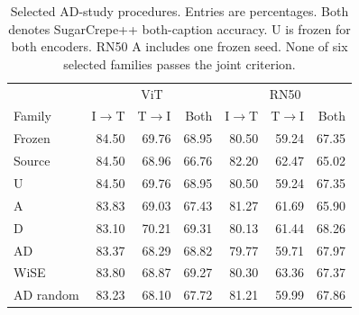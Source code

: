 \begin{table}[t]
\centering
\footnotesize
\setlength{\tabcolsep}{3pt}
\begin{tabular}{lrrrrrr}
\toprule
& \multicolumn{3}{c}{ViT} & \multicolumn{3}{c}{RN50}\\Family & I$\to$T & T$\to$I & Both & I$\to$T & T$\to$I & Both\\
\midrule
Frozen & 84.50 & 69.76 & 68.95 & 80.50 & 59.24 & 67.35\\
Source & 84.50 & 68.96 & 66.76 & 82.20 & 62.47 & 65.02\\
U & 84.50 & 69.76 & 68.95 & 80.50 & 59.24 & 67.35\\
A & 83.83 & 69.03 & 67.43 & 81.27 & 61.69 & 65.90\\
D & 83.10 & 70.21 & 69.31 & 80.13 & 61.44 & 68.26\\
AD & 83.37 & 68.29 & 68.82 & 79.77 & 59.71 & 67.97\\
WiSE & 83.80 & 68.87 & 69.27 & 80.30 & 63.36 & 67.37\\
AD random & 83.23 & 68.10 & 67.72 & 81.21 & 59.99 & 67.86\\
\bottomrule
\end{tabular}
\caption{Selected AD-study procedures. Entries are percentages. Both denotes SugarCrepe++ both-caption accuracy. U is frozen for both encoders. RN50 A includes one frozen seed. None of six selected families passes the joint criterion.}\label{tab:newpreservation}
\end{table}
